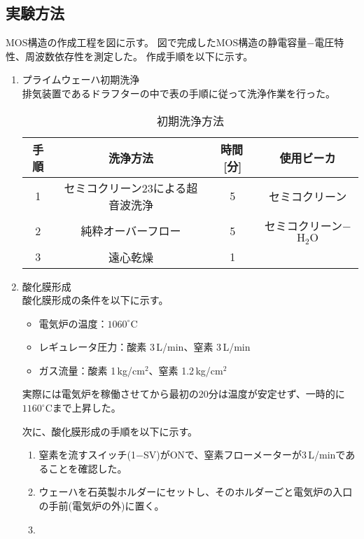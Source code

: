 \documentclass[11pt]{jarticle}
\begin{document}
	\subsection{実験方法}
		MOS構造の作成工程を図に示す。
		図で完成したMOS構造の静電容量−電圧特性、周波数依存性を測定した。
		作成手順を以下に示す。
		\begin{enumerate}
			\item プライムウェーハ初期洗浄\\
				排気装置であるドラフターの中で表の手順に従って洗浄作業を行った。
				\begin{table}[H]
				\begin{center}
				\caption{初期洗浄方法}
				\label{tab:wash}
				\begin{tabular}{c|ccc} \toprule
					手順&洗浄方法&時間\,[分]&使用ビーカ\\ \hline
					1&セミコクリーン23による超音波洗浄&5&セミコクリーン\\
					2&純粋オーバーフロー&5&セミコクリーン−$\mathrm{H_{2}O}$\\
					3&遠心乾燥&1&\\ \hline
				\end{tabular}
				\end{center}
				\end{table}

			\item 酸化膜形成\\
				酸化膜形成の条件を以下に示す。
				\begin{itemize}
					\item 電気炉の温度：$1060^\circ \mathrm{C}$
					\item レギュレータ圧力：酸素 3\,L/min、窒素 3\,L/min
					\item ガス流量：酸素 1\,kg/$\mathrm{cm^{2}}$、窒素 1.2\,kg/$\mathrm{cm^{2}}$
				\end{itemize}
				実際には電気炉を稼働させてから最初の20分は温度が安定せず、一時的に$1160^\circ \mathrm{C}$まで上昇した。

				次に、酸化膜形成の手順を以下に示す。
				\begin{enumerate}
					\item 窒素を流すスイッチ(1−SV)がONで、窒素フローメーターが3\,L/minであることを確認した。
					\item ウェーハを石英製ホルダーにセットし、そのホルダーごと電気炉の入口の手前(電気炉の外)に置く。
					\item 
				\end{enumerate}


\end{enumerate}
\end{document}
